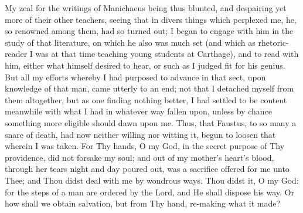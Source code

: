 \documentclass[b5paper,openright,12pt,twoside]{book}
\begin{document}
My zeal for the writings of Manichaeus being thus blunted, and
despairing yet more of their other teachers, seeing that in divers
things which perplexed me, he, so renowned among them, had so turned
out; I began to engage with him in the study of that literature, on
which he also was much set (and which as rhetoric-reader I was at that
time teaching young students at Carthage), and to read with him, either
what himself desired to hear, or such as I judged fit for his genius.
But all my efforts whereby I had purposed to advance in that sect,
upon knowledge of that man, came utterly to an end; not that I detached
myself from them altogether, but as one finding nothing better, I had
settled to be content meanwhile with what I had in whatever way fallen
upon, unless by chance something more eligible should dawn upon me.
Thus, that Faustus, to so many a snare of death, had now neither willing
nor witting it, begun to loosen that wherein I was taken. For Thy hands,
O my God, in the secret purpose of Thy providence, did not forsake my
soul; and out of my mother's heart's blood, through her tears night and
day poured out, was a sacrifice offered for me unto Thee; and Thou didst
deal with me by wondrous ways. Thou didst it, O my God: for the steps
of a man are ordered by the Lord, and He shall dispose his way. Or how
shall we obtain salvation, but from Thy hand, re-making what it made?
\end{document}

